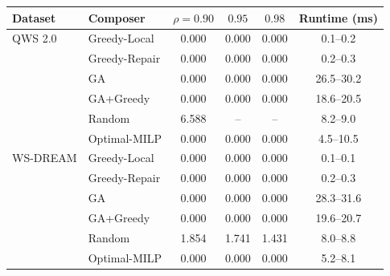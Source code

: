 \begin{tabular}{llcccc}
\toprule
Dataset & Composer & $\rho=0.90$ & $0.95$ & $0.98$ & Runtime (ms) \\
\midrule
QWS 2.0 & Greedy-Local & 0.000 & 0.000 & 0.000 & 0.1--0.2 \\
 & Greedy-Repair & 0.000 & 0.000 & 0.000 & 0.2--0.3 \\
 & GA & 0.000 & 0.000 & 0.000 & 26.5--30.2 \\
 & GA+Greedy & 0.000 & 0.000 & 0.000 & 18.6--20.5 \\
 & Random & 6.588 & -- & -- & 8.2--9.0 \\
 & Optimal-MILP & 0.000 & 0.000 & 0.000 & 4.5--10.5 \\
\midrule
WS-DREAM & Greedy-Local & 0.000 & 0.000 & 0.000 & 0.1--0.1 \\
 & Greedy-Repair & 0.000 & 0.000 & 0.000 & 0.2--0.3 \\
 & GA & 0.000 & 0.000 & 0.000 & 28.3--31.6 \\
 & GA+Greedy & 0.000 & 0.000 & 0.000 & 19.6--20.7 \\
 & Random & 1.854 & 1.741 & 1.431 & 8.0--8.8 \\
 & Optimal-MILP & 0.000 & 0.000 & 0.000 & 5.2--8.1 \\
\bottomrule
\end{tabular}
